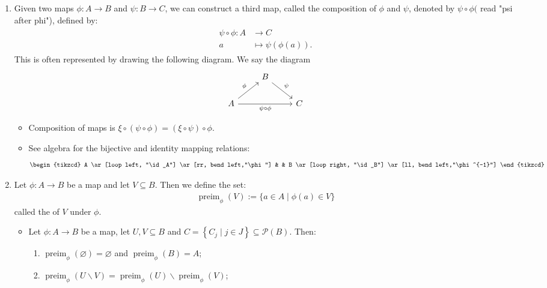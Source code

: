 \documentclass{article}
\begin{document}
\begin{enumerate}
\item {}
Given two maps $\phi: A \rightarrow B$ and $\psi: B \rightarrow C$, we can construct a third map, called the composition of $\phi$ and $\psi$, denoted by $\psi \circ \phi($ read "psi after phi"), defined by:
\begin{align*}
\begin{aligned}
\psi \circ \phi: A & \rightarrow C \\
a & \mapsto \psi(\phi(a)) .
\end{aligned}
\end{align*}
This is often represented by drawing the following diagram. We say the diagram 
\begin{equation*}
   \begin{tikzcd}
 &B \ar[dr,"\psi"]& \\
A \ar[ur,"\phi"] \ar[rr, "\psi\circ\phi"'] & & C
\end{tikzcd} 
\end{equation*}
\begin{itemize}
    \item Composition of maps is  $\xi \circ(\psi \circ \phi)=(\xi \circ \psi) \circ \phi$.
    \item See algebra for the bijective and identity mapping relations:
    \begin{equation*}
       \begin{tikzcd}
A \ar[loop left, "\id_A"] \ar[rr, bend left,"\phi"] & & B \ar[loop right, "\id_B"] \ar[ll, bend left,"\phi^{-1}"]
\end{tikzcd} 
\end{equation*}
\end{itemize}
\item {} Let $\phi: A \rightarrow B$ be a map and let $V \subseteq B$. Then we define the set:
\begin{align*}
\operatorname{preim}_{\phi}(V):=\{a \in A \mid \phi(a) \in V\}
\end{align*}
called the  of $V$ under $\phi$.
\begin{itemize}
\item Let $\phi: A \rightarrow B$ be a map, let $U, V \subseteq B$ and $C=\left\{C_{j} \mid j \in J\right\} \subseteq \mathcal{P}(B)$. Then:
\begin{enumerate}
 \item $\operatorname{preim}_{\phi}(\varnothing)=\varnothing$ and $\operatorname{preim}_{\phi}(B)=A$;
    \item $\operatorname{preim}_{\phi}(U \backslash V)=\operatorname{preim}_{\phi}(U) \backslash \operatorname{preim}_{\phi}(V)$;

\end{enumerate}
\end{itemize}
\end{enumerate}
\end{document}
